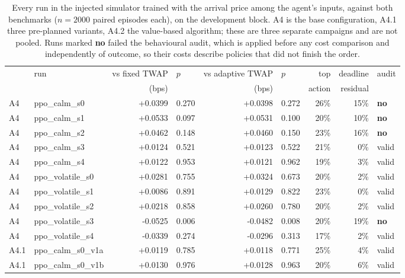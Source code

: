 \begin{table}[htbp]\centering
\caption{Every run in the injected simulator trained with the arrival price among the agent's
inputs, against both benchmarks ($n=2000$ paired episodes each), on the development block.
A4 is the base configuration, A4.1 three pre-planned variants, A4.2 the value-based algorithm;
these are three separate campaigns and are not pooled. Runs marked \textbf{no} failed the
behavioural audit, which is applied before any cost comparison and independently of outcome, so
their costs describe policies that did not finish the order.}
\label{tab:sigext-obsfix-per-run}
\scriptsize
\begin{tabular}{llrlrlrrl}
\toprule
 & run & vs fixed TWAP & $p$ & vs adaptive TWAP & $p$ & top & deadline & audit \\
 & & (bps) & & (bps) & & action & residual & \\
\midrule
A4 & ppo\_calm\_s0 & +0.0399 & 0.270 & +0.0398 & 0.272 & 26\% & 15\% & \textbf{no} \\
A4 & ppo\_calm\_s1 & +0.0533 & 0.097 & +0.0531 & 0.100 & 20\% & 10\% & \textbf{no} \\
A4 & ppo\_calm\_s2 & +0.0462 & 0.148 & +0.0460 & 0.150 & 23\% & 16\% & \textbf{no} \\
A4 & ppo\_calm\_s3 & +0.0124 & 0.521 & +0.0123 & 0.522 & 21\% & 0\% & valid \\
A4 & ppo\_calm\_s4 & +0.0122 & 0.953 & +0.0121 & 0.962 & 19\% & 3\% & valid \\
A4 & ppo\_volatile\_s0 & +0.0281 & 0.755 & +0.0324 & 0.673 & 20\% & 2\% & valid \\
A4 & ppo\_volatile\_s1 & +0.0086 & 0.891 & +0.0129 & 0.822 & 23\% & 0\% & valid \\
A4 & ppo\_volatile\_s2 & +0.0218 & 0.858 & +0.0260 & 0.780 & 20\% & 2\% & valid \\
A4 & ppo\_volatile\_s3 & -0.0525 & 0.006 & -0.0482 & 0.008 & 20\% & 19\% & \textbf{no} \\
A4 & ppo\_volatile\_s4 & -0.0339 & 0.274 & -0.0296 & 0.313 & 17\% & 2\% & valid \\
\midrule
A4.1 & ppo\_calm\_s0\_v1a & +0.0119 & 0.785 & +0.0118 & 0.771 & 25\% & 4\% & valid \\
A4.1 & ppo\_calm\_s0\_v1b & +0.0130 & 0.976 & +0.0128 & 0.963 & 20\% & 6\% & valid \\

\end{tabular}
\end{table}
